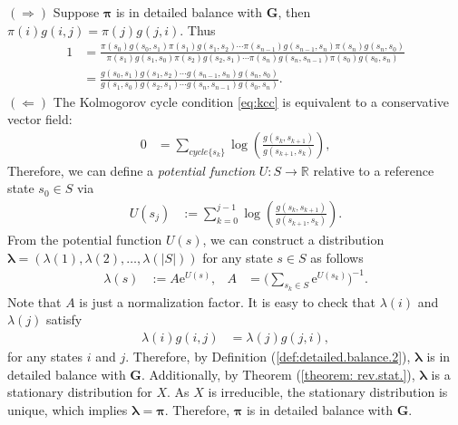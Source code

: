 \documentclass[12pt]{book}
\numberwithin{equation}{chapter}
\theoremstyle{plain}
\numberwithin{theorem}{section}
\theoremstyle{definition}
\numberwithin{exercise}{chapter}
\let\oldendproof\endproof
\renewenvironment{proof}[1][\proofname]{%
  \oldproof[\scshape\underline{#1}]%
}{\oldendproof}
\newcommand{\<}{\langle}
\renewcommand{\>}{\rangle}
\renewcommand{\(}{\left(}
\renewcommand{\)}{\right)}
\renewcommand{\[}{\left[}
\renewcommand{\]}{\right]}
\newcommand\Rb{\mathds{R}}
\newcommand\lam{\lambda}
\newcommand\Gv{\pmb{G}}
\newcommand\piv{\pmb{\pi}}
\newcommand\lamv{\pmb{\lambda}}
\newcommand\ee{\mathrm{e}}
\begin{document}
\begin{proof}
$(\Rightarrow)$ 
Suppose $\piv$ is in detailed balance with $\Gv$, then
$\pi(i) g(i ,j) = \pi(j)g(j, i)$.  Thus
\begin{align}
1
	&= \frac{\pi(s_0)g(s_0, s_1) \pi(s_1)g(s_1, s_2)\cdots \pi(s_{n-1})g(s_{n-1}, s_n) \pi(s_n) g(s_n, s_0)}
	{\pi(s_1)g(s_1, s_0)\pi(s_2)g(s_2, s_1)\cdots \pi(s_n)g(s_n, s_{n-1})\pi(s_0)g(s_0, s_n)} \\ 
	&=	\frac{g(s_0, s_1)g(s_1, s_2)\cdots g(s_{n-1}, s_n)g(s_n, s_0)}
	{g(s_1, s_0)g(s_2, s_1)\cdots g(s_n, s_{n-1})g(s_0, s_n)} . 
\end{align}
$(\Leftarrow)$ 
The Kolmogorov cycle condition \eqref{eq:kcc} is equivalent to a conservative vector field:
\begin{align}
0
	&=	\sum_{cycle \{s_k\}} \log \( \frac{g(s_{k}, s_{k+1})}{g(s_{k+1}, s_{k})}\) ,
\end{align}
Therefore, we can define a \textit{potential function} $U : S \to \Rb$ relative to a reference state $s_0 \in S$ via
\begin{align}
U(s_j) 
	&:=	\sum_{k=0}^{j-1} \log \(\frac{g(s_k, s_{k+1})}{g(s_{k+1}, s_k)} \). \label{proof:kolmogorov.cond}
\end{align}
From the potential function $U(s)$, we can construct a distribution $\lamv = (\lam(1), \lam(2), \ldots, \lam(|S|))$ for any state $s \in S$ as follows
\begin{align}
\lam(s) 
	&:= 	A \ee^{U(s)} , &
A
	&=		\Big( \sum_{s_k \in S} \ee^{U(s_k)} \Big)^{-1} .
\end{align}
Note that $A$ is just a normalization factor.  It is easy to check that $\lambda(i)$ and $\lambda(j)$ satisfy 
\begin{align}
\lambda(i)g(i,j)
	&=	\lambda(j)g(j,i) ,
\end{align}
for any states $i$ and $j$.  Therefore, by Definition (\ref{def:detailed.balance.2}), $\lamv$ is in detailed balance with $\Gv$. Additionally, by Theorem (\ref{theorem: rev.stat.}), $\lamv$ is a stationary distribution for $X$.  As $X$ is irreducible, the stationary distribution is unique, which implies $\lamv = \piv$.  Therefore, $\piv$ is in detailed balance with $\Gv$.
\end{proof}
\end{document}

